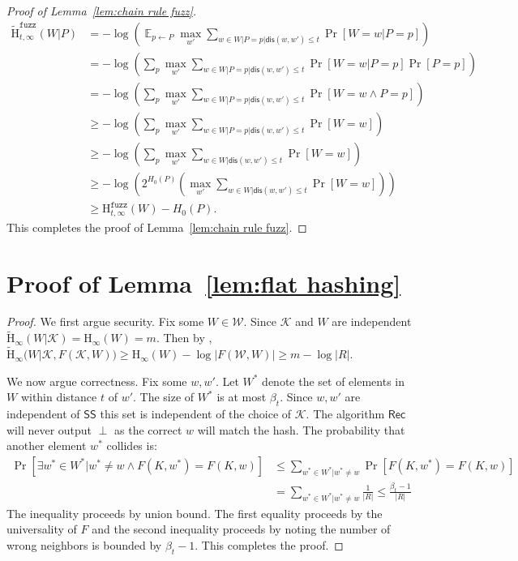 \documentclass[11pt]{article}
\newcommand{\lemref}[1]{\mbox{Lemma~\ref{#1}}}
\DeclareMathOperator*{\expe}{\mathbb{E}}
\newcommand{\class}[1]{{\ensuremath{\mathsf{#1}}}}
\newcommand{\sketch}{\ensuremath{\class{SS}}\xspace}
\newcommand{\rec}{\ensuremath{\class{Rec}}\xspace}
\newcommand{\dis}{\ensuremath{\mathsf{dis}}}
\newcommand{\Hoo}{\mathrm{H}_\infty}
\newcommand{\Hav}{\tilde{\mathrm{H}}_\infty}
\newcommand{\Hfuzz}{\mathrm{H}^{\mathtt{fuzz}}_{t,\infty}}
\newcommand{\Hfav}{\tilde{\mathrm{H}}^{\mathtt{fuzz}}_{t,\infty}}
\begin{document}
\begin{proof}[Proof of \lemref{lem:chain rule fuzz}]
\begin{align*}
\Hfav(W|P) &= -\log \left( \expe_{p\leftarrow P} \max_{w'} \sum_{w\in W |P =p | \dis(w, w')\le t} \Pr[W=w|P=p] \right)\\
&= -\log \left( \sum_{p} \max_{w'} \sum_{w\in W |P =p | \dis(w, w')\le t} \Pr[W=w|P=p]\Pr[P=p] \right)\\
&= -\log \left( \sum_{p} \max_{w'} \sum_{w\in W |P =p | \dis(w, w')\le t} \Pr[W=w \wedge P=p] \right)\\
&\ge -\log \left( \sum_{p} \max_{w'} \sum_{w\in W |P =p | \dis(w, w')\le t} \Pr[W=w] \right)\\
&\ge -\log \left( \sum_{p} \max_{w'} \sum_{w\in W | \dis(w, w')\le t} \Pr[W=w] \right)\\
&\ge -\log \left( 2^{H_0(P)} \left(\max_{w'} \sum_{w\in W | \dis(w, w')\le t} \Pr[W=w] \right)\right)\\
&\ge \Hfuzz(W) - H_0(P).
\end{align*}
This completes the proof of \lemref{lem:chain rule fuzz}.
\end{proof}



\section{Proof of \lemref{lem:flat hashing}}
\label{sec:proof of flat hashing}
\begin{proof}
We first argue security.  Fix some $W\in\mathcal{W}$. Since $\mathcal{K}$ and $W$ are independent $\Hav(W | \mathcal{K}) = \Hoo(W) = m$.  Then by \cite[Lemma 2.2b]{DBLP:journals/siamcomp/DodisORS08}, $\Hav(W | \mathcal{K}, F(\mathcal{K}, W)) \ge \Hoo(W) - \log |F(\mathcal{W}, W)| \ge m - \log |R|$.

We now argue correctness.  Fix some $w, w'$.  Let $W^*$ denote the set of elements in $W$ within distance $t$ of $w'$.  The size of $W^*$ is at most $\beta_{t}$.  Since $w, w'$ are independent of $\sketch$ this set is independent of the choice of $\mathcal{K}$.  The algorithm  $\rec$ will never output $\perp$ as the correct $w$ will match the hash.  The probability that another element $w^*$ collides is:
\begin{align*}
\Pr[\exists w^* \in W^* |w^* \neq w \wedge F(K, w^*) = F(K, w)] &\le \sum_{w^*\in W^* | w^*\neq w} \Pr[F(K, w^*) = F(K, w)] \\
 &= \sum_{w^*\in W^* | w^*\neq w} \frac{1}{|R|} \le \frac{\beta_{t}-1}{|R|}
\end{align*}
The inequality proceeds by union bound. The first equality proceeds by the universality of $F$ and the second inequality proceeds by noting the number of wrong neighbors is bounded by $\beta_{t}-1$.  This completes the proof.
\end{proof}
\end{document}
